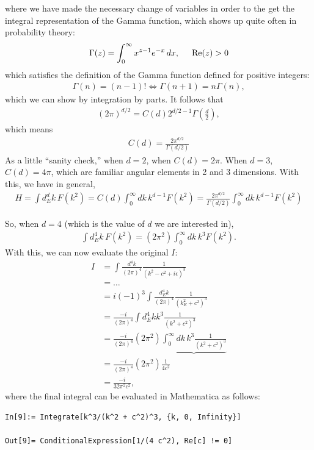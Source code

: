 \documentclass{book}
\theoremstyle{definition}
\newcommand{\f}[2]{\frac{#1}{#2}}
\newcommand{\lp}{\left(}
\newcommand{\rp}{\right)}
\begin{document}
where we have made the necessary change of variables in order to the get the integral representation of the Gamma function, which shows up quite often in probability theory:
\begin{align}
{\Gamma(z) = \int^\infty_0 x^{z-1}e^{-x}\,dx, \hspace{0.5cm} \Re(z) > 0}
\end{align}
which satisfies the definition of the Gamma function defined for positive integers:
\begin{align}
\Gamma(n) = (n-1)! \iff \Gamma(n+1) = n\Gamma(n),
\end{align}
which we can show by integration by parts. It follows that
\begin{align}
\lp 2\pi \rp^{d/2} = C(d) 2^{d/2 - 1} \Gamma\lp \f{d}{2} \rp,
\end{align}
which means 
\begin{align}
\boxed{C(d) = \f{2\pi^{d/2}}{\Gamma\lp d/2 \rp}}
\end{align}
As a little ``sanity check,'' when $d=2$, when $C(d) = 2\pi$. When $d=3$, $C(d) = 4\pi$, which are familiar angular elements in 2 and 3 dimensions. With this, we have in general,
\begin{align}
\boxed{H = \int d^d_E k \,F(k^2) = C(d)\int^\infty_0 dk\, k^{d-1}F(k^2)= \f{2\pi^{d/2}}{\Gamma\lp d/2 \rp}\int^\infty_0 dk\, k^{d-1}F(k^2)}
\end{align}

So, when $d=4$ (which is the value of $d$ we are interested in), 
\begin{align}
\int d^4_E k \, F(k^2) = (2\pi^2) \int^\infty_0 dk\,k^3 F(k^2).
\end{align}
With this, we can now evaluate the original $I$:
\begin{align}
I &= \int \f{d^4k}{(2\pi)^4} \f{1}{(k^2 - c^2+ i\epsilon)^3}\nonumber\\
&= \dots \nonumber\\ 
&= i(-1)^3\int \f{d^4_E k}{(2\pi)^4} \f{1}{(k^2_E + c^2)^3} \nonumber\\
&= \f{-i}{(2\pi)^4}\int d^4_E k k^3 \f{1}{(k^2 + c^2)^3}  \nonumber\\
&= \f{-i}{(2\pi)^4} (2\pi^2) \underbrace{\int^\infty_0 dk\,k^3   \f{1}{(k^2 + c^2)^3}} \nonumber\\
&= \f{-i}{(2\pi)^4} (2\pi^2) \f{1}{4c^2} \nonumber\\
&= {\f{-i}{32 \pi^2 c^2}},
\end{align}
where the final integral can be evaluated in Mathematica as follows:
\begin{lstlisting}
In[9]:= Integrate[k^3/(k^2 + c^2)^3, {k, 0, Infinity}]

Out[9]= ConditionalExpression[1/(4 c^2), Re[c] != 0]
\end{lstlisting}
$\,$\\
\end{document}
